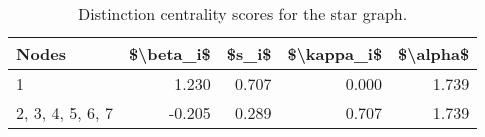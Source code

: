 \begin{table}
\centering
\caption{\label{tab:star}Distinction centrality scores for the star graph.}
\centering
\begin{tabular}[t]{lrrrr}
\toprule
Nodes & \$\textbackslash{}beta\_i\$ & \$s\_i\$ & \$\textbackslash{}kappa\_i\$ & \$\textbackslash{}alpha\$\\
\midrule
1 & 1.230 & 0.707 & 0.000 & 1.739\\
2, 3, 4, 5, 6, 7 & -0.205 & 0.289 & 0.707 & 1.739\\
\bottomrule
\end{tabular}
\end{table}
